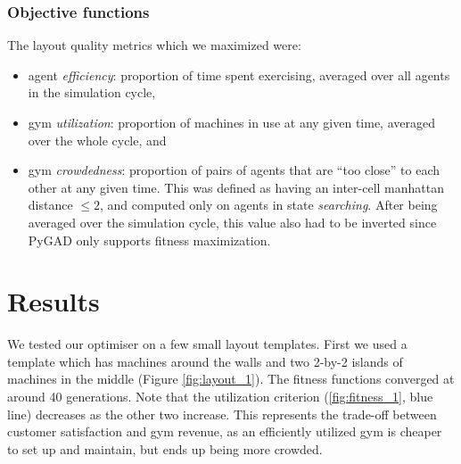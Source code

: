 \documentclass[9pt]{pnas-new}
\begin{document}
\subsubsection*{Objective functions} \label{sec:objectives}

The layout quality metrics which we maximized were: 
\begin{itemize}
	\item agent {\it efficiency}: proportion of time spent exercising, averaged over all agents in the simulation cycle,
	\item gym {\it utilization}: proportion of machines in use at any given time, averaged over the whole cycle, and
	\item gym {\it crowdedness}: proportion of pairs of agents that are ``too close'' to each other at any given time. This was defined as having an inter-cell manhattan distance $\leq 2$, and computed only on agents in state {\it searching}.
    After being averaged over the simulation cycle, this value also had to be inverted since PyGAD only supports fitness maximization.
\end{itemize}



\section*{Results}

We tested our optimiser on a few small layout templates. First we used a template which has machines around the walls and two 2-by-2 islands of machines in the middle (Figure \ref{fig:layout_1}). The fitness functions converged at around 40 generations.
Note that the utilization criterion (\ref{fig:fitness_1}, blue line) decreases as the other two increase. This represents the trade-off between customer satisfaction and gym revenue, as an efficiently utilized gym is cheaper to set up and maintain, but ends up being more crowded.
\end{document}
